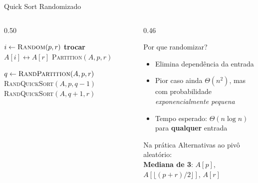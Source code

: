 \documentclass[aspectratio=169]{beamer}
\begin{document}
\begin{frame}[fragile,shrink=8]{Quick Sort Randomizado}
  \begin{columns}[T]
    \begin{column}{0.50\textwidth}
      \begin{algorithm}[H]
        \caption{\textsc{RandPartition}$(A, p, r)$}
        \begin{algorithmic}[1]
          \State $i \gets \textsc{Random}(p, r)$
          \State \textbf{trocar} $A[i] \leftrightarrow A[r]$
          \State \Return \textsc{Partition}$(A, p, r)$
        \end{algorithmic}
      \end{algorithm}

      \vspace{8pt}
      \begin{algorithm}[H]
        \caption{\textsc{RandQuickSort}$(A, p, r)$}
        \begin{algorithmic}[1]
            \State $q \gets \textsc{RandPartition}(A, p, r)$
            \State \textsc{RandQuickSort}$(A, p, q{-}1)$
            \State \textsc{RandQuickSort}$(A, q{+}1, r)$
          \EndIf
        \end{algorithmic}
      \end{algorithm}
    \end{column}
    \begin{column}{0.46\textwidth}
      \begin{block}{Por que randomizar?}
        \begin{itemize}
          \item Elimina dependência da entrada
          \item Pior caso ainda $\Theta(n^2)$, mas com probabilidade
                \emph{exponencialmente pequena}
          \item Tempo esperado: $\Theta(n \log n)$ para \textbf{qualquer} entrada
        \end{itemize}
      \end{block}
      \vspace{6pt}
      \begin{exampleblock}{Na prática}
        Alternativas ao pivô aleatório:\\
        \textbf{Mediana de 3}: $A[p]$, $A[\lfloor(p{+}r)/2\rfloor]$, $A[r]$
      \end{exampleblock}
    \end{column}
  \end{columns}
\end{frame}
\end{document}
